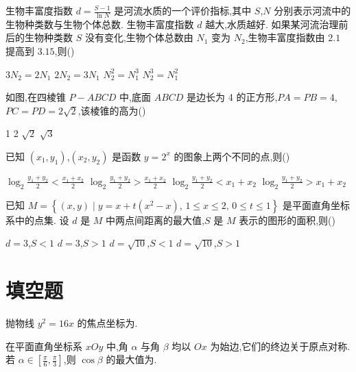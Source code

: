 \begin{problem}
生物丰富度指数 \(d=\frac{S-1}{\ln N}\) 是河流水质的一个评价指标,其中 \(S\),\(N\) 分别表示河流中的生物种类数与生物个体总数. 生物丰富度指数 \(d\) 越大,水质越好. 如果某河流治理前后的生物种类数 \(S\) 没有变化,生物个体总数由 \(N_1\) 变为 \(N_2\),生物丰富度指数由 \(2.1\) 提高到 \(3.15\),则(\quad)

\choices
    {\(3N_2=2N_1\)}
    {\(2N_2=3N_1\)}
    {\(N_2^2=N_1^3\)}
    {\(N_2^3=N_1^2\)}
\end{problem}

\begin{problem}
如图,在四棱锥 \(P-ABCD\) 中,底面 \(ABCD\) 是边长为 4 的正方形,\(PA=PB=4\),\(PC=PD=2\sqrt{2}\),该棱锥的高为(\quad)


\choices
    {1}
    {2}
    {\(\sqrt{2}\)}
    {\(\sqrt{3}\)}
\end{problem}

\begin{problem}
已知 \((x_1,y_1)\),\((x_2,y_2)\) 是函数 \(y=2^x\) 的图象上两个不同的点,则(\quad)

\choices
    {\(\log_2 \frac{y_1+y_2}{2}<\frac{x_1+x_2}{2}\)}
    {\(\log_2 \frac{y_1+y_2}{2}>\frac{x_1+x_2}{2}\)}
    {\(\log_2 \frac{y_1+y_2}{2}<x_1+x_2\)}
    {\(\log_2 \frac{y_1+y_2}{2}>x_1+x_2\)}
\end{problem}

\begin{problem}
已知 \(M=\left\{ (x,y)\mid y=x+t\left( x^2-x \right),\,1\le x\le 2,\,0\le t\le 1 \right\}\) 是平面直角坐标系中的点集. 设 \(d\) 是 \(M\) 中两点间距离的最大值,\(S\) 是 \(M\) 表示的图形的面积,则(\quad)

\choices
    {\(d=3\),\(S<1\)}
    {\(d=3\),\(S>1\)}
    {\(d=\sqrt{10}\),\(S<1\)}
    {\(d=\sqrt{10}\),\(S>1\)}
\end{problem}

\section{填空题}

\begin{problem}
抛物线 \(y^2=16x\) 的焦点坐标为\fillinblank{}.
\end{problem}

\begin{problem}
在平面直角坐标系 \(xOy\) 中,角 \(\alpha\) 与角 \(\beta\) 均以 \(Ox\) 为始边,它们的终边关于原点对称. 若 \(\alpha\in \left[ \frac{\pi}{6},\frac{\pi}{3} \right]\),则 \(\cos \beta\) 的最大值为\fillinblank{}.
\end{problem}


